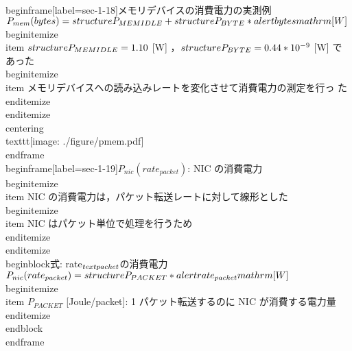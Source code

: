 {{{\\begin{frame}[label=sec-1-18]{メモリデバイスの消費電力の実測例}
$P_{mem}(bytes) = \\structure{P_{MEMIDLE}} + \\structure{P_{BYTE}} * \\alert{bytes} \\mathrm{[W]}$
\\begin{itemize}
\\item $\\structure{P_{MEMIDLE}} = 1.10$ [W] ，$\\structure{P_{BYTE}} =
     0.44 * 10^{-9}$ [W] であった
\\begin{itemize}
\\item メモリデバイスへの読み込みレートを変化させて消費電力の測定を行っ
た
\\end{itemize}
\\end{itemize}
\\centering
\\texttt{[image: ./figure/pmem.pdf]}
\\end{frame}
\\begin{frame}[label=sec-1-19]{$P_{nic}(rate_{packet})$: NIC の消費電力}
\\begin{itemize}
\\item NIC の消費電力は，パケット転送レートに対して線形とした
\\begin{itemize}
\\item NIC はパケット単位で処理を行うため
\\end{itemize}
\\end{itemize}
\\begin{block}{式: rate$_{\\text{packet}}$の消費電力}%
$P_{nic}(rate_{packet}) = \\structure{P_{PACKET}} * \\alert{rate_{packet}} \\mathrm{[W]}$
\\begin{itemize}
\\item $P_{PACKET}$ [Joule/packet]: 1 パケット転送するのに NIC が消費する電力量
\\end{itemize}
\\end{block}
\\end{frame}

}}}
